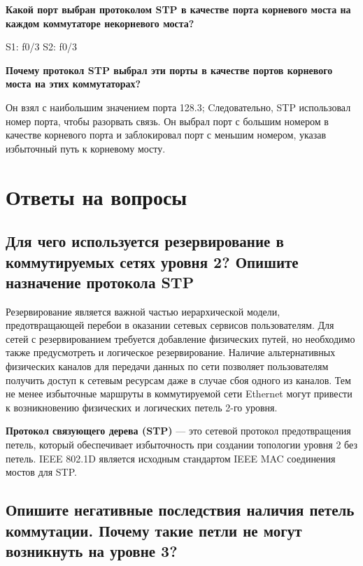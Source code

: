 \textbf{Какой порт выбран протоколом STP в качестве порта корневого моста
	на каждом коммутаторе некорневого моста?}

S1: f0/3
S2: f0/3

\textbf{Почему протокол STP выбрал эти порты в качестве портов
	корневого моста на этих коммутаторах?}

Он взял с наибольшим значением порта 128.3;
Cледовательно, STP использовал номер порта, чтобы разорвать связь.
Он выбрал порт с большим номером в качестве корневого порта
и заблокировал порт с меньшим номером,
указав избыточный путь к корневому мосту.


\section{Ответы на вопросы}

\subsection{Для чего используется резервирование в коммутируемых сетях 
	уровня 2? Опишите назначение протокола STP}

Резервирование является важной частью иерархической модели, 
предотвращающей перебои в оказании сетевых сервисов пользователям. Для 
сетей с резервированием требуется добавление физических путей, но 
необходимо также предусмотреть и логическое резервирование. Наличие 
альтернативных физических каналов для передачи данных по сети позволяет 
пользователям получить доступ к сетевым ресурсам даже в случае сбоя 
одного из каналов. Тем не менее избыточные маршруты в коммутируемой 
сети Ethernet могут привести к возникновению физических и логических 
петель 2-го уровня.\par
\textbf{Протокол связующего дерева (STP)} --- это сетевой протокол 
предотвращения петель, который обеспечивает избыточность при создании 
топологии уровня 2 без петель. IEEE 802.1D является исходным стандартом 
IEEE MAC соединения мостов для STP.

\subsection{Опишите негативные последствия наличия петель коммутации. 
	Почему такие петли не могут возникнуть на уровне 3?}

